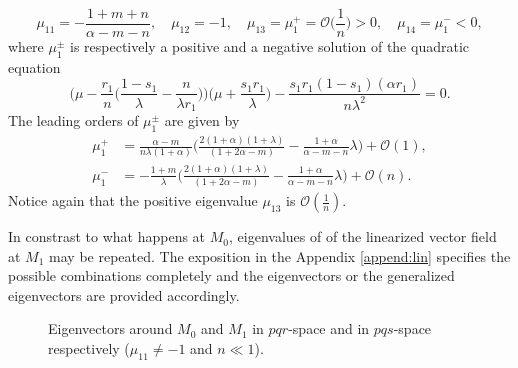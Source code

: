 \documentclass[a4paper,11pt]{article}
\def\BO{{\mathcal{O}}}
\theoremstyle{remark}
\begin{document}
\begin{itemize}
\begin{equation} \label{eq:eigM1}
 \mu_{11}=-\frac{1+m+n}{\alpha-m-n}, \quad \mu_{12}=-1, \quad \mu_{13}=\mu_1^+=\BO\Big(\frac{1}{n}\Big)>0, \quad \mu_{14}=\mu_1^{-}<0,
\end{equation}
where $\mu_1^\pm$ is respectively a positive and a negative solution of the quadratic equation
 $$ \Big(\mu - \frac{r_1}{n}\Big(\frac{1-s_1}{\lambda}-\frac{n}{\lambda r_1}\Big)\Big)\Big(\mu + \frac{s_1r_1}{\lambda}\Big) - %
\frac{s_1r_1(1-s_1)(\alpha r_1)}{n\lambda^2} = 0.$$
The leading orders of $\mu_1^\pm$ are given by
\begin{align*}
\mu_1^+ &= \frac{\alpha-m}{n\lambda(1+\alpha)}\Big(\frac{2(1+\alpha)(1+\lambda)}{(1+2\alpha-m) } - \frac{1+\alpha}{\alpha-m-n}\lambda\Big) + \BO(1), \\
\mu_1^- &= -\frac{1+m}{\lambda}\Big(\frac{2(1+\alpha)(1+\lambda)}{(1+2\alpha-m) } - \frac{1+\alpha}{\alpha-m-n}\lambda\Big) + \BO(n).
\end{align*}
Notice again that the positive eigenvalue $\mu_{13}$ is $\mathcal{O}( \frac{1}{n})$.

In constrast to what happens at $M_0$, eigenvalues of of the linearized vector field at $M_1$ may be repeated. The exposition in the Appendix \ref{append:lin} specifies the possible combinations completely and the eigenvectors or the generalized eigenvectors are provided accordingly.
\end{itemize}
\begin{figure}
 \centering
  \subfigure[$pqr$-space]{
  \psfrag{r}{\scriptsize$r$}%
  \texttt{[image: equilibriapqr.eps]}\label{fig:eq1}
  }
  \quad \quad
  \subfigure[$pqs$-space]{
  \psfrag{r}{\scriptsize$s-\frac{1+m}{1+\alpha}$}%
  \texttt{[image: equilibriapqs.eps]}\label{fig:eq2}
  }
  \caption{Eigenvectors around $M_0$ and $M_1$ in $pqr$-space and in $pqs$-space respectively ($\mu_{11}\ne-1$ and $n\ll1$). } \label{fig:equilibria}
\end{figure}
\end{document}
